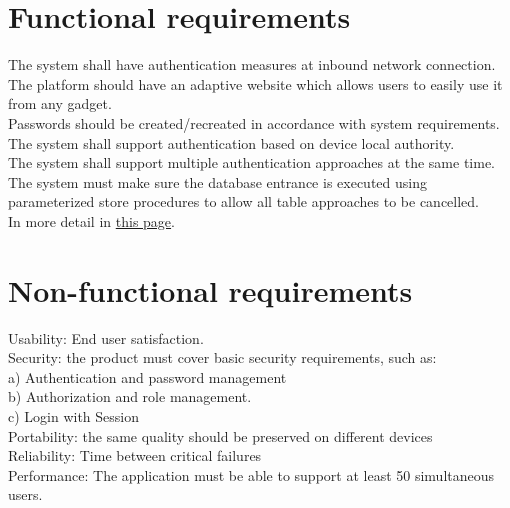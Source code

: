 \section{Functional requirements}\vspace{0.3cm}
The system shall have authentication measures at inbound network connection.\\
The platform should have an adaptive website which allows users to easily use it from any gadget.\\
Passwords should be created/recreated in accordance with system requirements.\\
The system shall support authentication based on device local authority.\\
The system shall support multiple authentication approaches at the same time.\\
The system must make sure the database entrance is executed using parameterized store procedures to allow all table approaches to be cancelled.\\
In more detail in \hyperlink{thistable}{this page}.
\section{Non-functional requirements}
Usability: End user satisfaction. \\
Security: the product must cover basic security requirements, such as: \\
a) Authentication and password management\\
b) Authorization and role management.\\
c) Login with Session \\
Portability: the same quality should be preserved on different devices\\
Reliability: Time between critical failures\\
Performance: The application must be able to support at least 50 simultaneous users.\\

